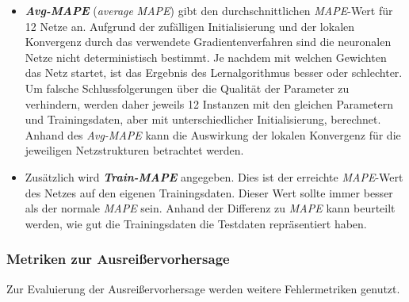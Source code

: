 \documentclass[
	twoside,
	12pt,
	a4paper,
	BCOR10mm,
	DIV14,
	listof=totoc,
	bibliography=totoc,
	headsepline
]{scrreprt}
\begin{document}
\begin{itemize}
	\item \textit{\textbf{Avg-MAPE}} (\textit{average} \textit{MAPE}) gibt den durchschnittlichen \textit{MAPE}-Wert für 12 Netze an. 
	Aufgrund der zufälligen Initialisierung und der lokalen Konvergenz durch das verwendete Gradientenverfahren sind die neuronalen Netze nicht deterministisch bestimmt.
	Je nachdem mit welchen Gewichten das Netz startet, ist das Ergebnis des Lernalgorithmus besser oder schlechter. Um falsche Schlussfolgerungen über die Qualität der Parameter zu verhindern, werden daher jeweils 12 Instanzen mit den gleichen Parametern und Trainingsdaten, aber mit unterschiedlicher Initialisierung, berechnet.
	Anhand des \textit{Avg-MAPE} kann die Auswirkung der lokalen Konvergenz für die jeweiligen Netzstrukturen betrachtet werden.
	\item Zusätzlich wird \textit{\textbf{Train-MAPE}} angegeben. Dies ist der erreichte \textit{MAPE}-Wert des Netzes auf den eigenen Trainingsdaten. Dieser Wert sollte immer besser als der normale \textit{MAPE} sein. Anhand der Differenz zu \textit{MAPE} kann beurteilt werden, wie gut die Trainingsdaten die Testdaten repräsentiert haben.
\end{itemize}

\subsubsection{Metriken zur Ausreißervorhersage}
Zur Evaluierung der Ausreißervorhersage werden weitere Fehlermetriken genutzt.\medskip
\end{document}
